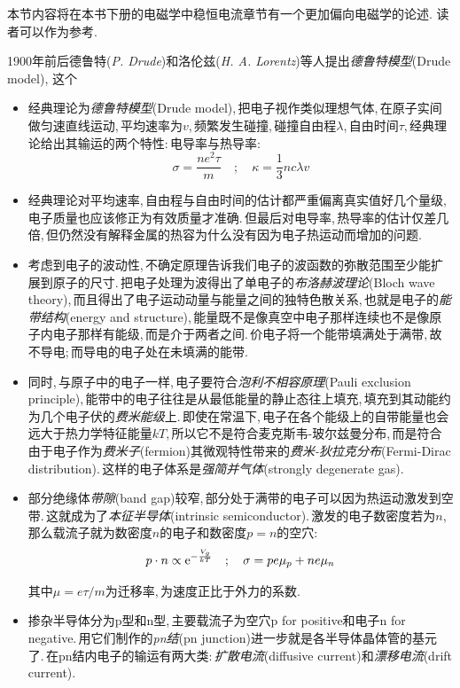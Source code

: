 本节内容将在本书下册的电磁学中稳恒电流章节有一个更加偏向电磁学的论述. 读者可以作为参考.

1900年前后德鲁特({\it P. Drude})和洛伦兹({\it H. A. Lorentz})等人提出\emph{德鲁特模型}(Drude model), 这个


\begin{itemize}
	\item 经典理论为\emph{德鲁特模型}(Drude model),\,把电子视作类似理想气体,\,在原子实间做匀速直线运动,\,平均速率为$v$,\,频繁发生碰撞,\,碰撞自由程$\lambda$,\,自由时间$\tau$,\,经典理论给出其输运的两个特性:\,电导率与热导率:
	\[\sigma=\frac{ne^2\tau}{m}\quad ;\quad \kappa=\frac{1}{3}nc\lambda v\]

	\item 经典理论对平均速率,\,自由程与自由时间的估计都严重偏离真实值好几个量级,\,电子质量也应该修正为有效质量才准确.\,但最后对电导率,\,热导率的估计仅差几倍,\,但仍然没有解释金属的热容为什么没有因为电子热运动而增加的问题.
	\item 考虑到电子的波动性,\,不确定原理告诉我们电子的波函数的弥散范围至少能扩展到原子的尺寸.\,把电子处理为波得出了单电子的\emph{布洛赫波理论}(Bloch wave theory),\,而且得出了电子运动动量与能量之间的独特色散关系,\,也就是电子的\emph{能带结构}(energy and structure),\,能量既不是像真空中电子那样连续也不是像原子内电子那样有能级,\,而是介于两者之间.\,价电子将一个能带填满处于满带,\,故不导电;\,而导电的电子处在未填满的能带.

	\item 同时,\,与原子中的电子一样,\,电子要符合\emph{泡利不相容原理}(Pauli exclusion principle),\,能带中的电子往往是从最低能量的静止态往上填充,\,填充到其动能约为几个电子伏的\emph{费米能级}上.\,即使在常温下,\,电子在各个能级上的自带能量也会远大于热力学特征能量$kT$,\,所以它不是符合麦克斯韦-玻尔兹曼分布,\,而是符合由于电子作为\emph{费米子}(fermion)其微观特性带来的\emph{费米-狄拉克分布}(Fermi-Dirac distribution).\,这样的电子体系是\emph{强简并气体}(strongly degenerate gas).
	\item 部分绝缘体\emph{带隙}(band gap)较窄,\,部分处于满带的电子可以因为热运动激发到空带.\,这就成为了\emph{本征半导体}(intrinsic semiconductor).\,激发的电子数密度若为$n$,\,那么载流子就为数密度$n$的电子和数密度$p=n$的空穴:
	\[p\cdot n\propto {\rm e}^{-\frac{V_g}{kT}}\quad ;\quad \sigma=pe\mu_p+ne\mu_n\]

	其中$\mu=e\tau/m$为迁移率,\,为速度正比于外力的系数.

	\item 掺杂半导体分为p型和n型,\,主要载流子为空穴p for positive和电子n for negative.\,用它们制作的\emph{pn结}(pn junction)进一步就是各半导体晶体管的基元了.\,在pn结内电子的输运有两大类:\,\emph{扩散电流}(diffusive current)和\emph{漂移电流}(drift current).
\end{itemize}

